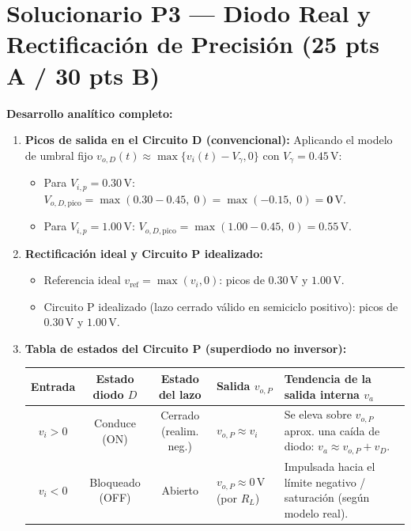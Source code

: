 \documentclass[10pt, a4paper]{article}
\begin{document}
\section*{Solucionario P3 --- Diodo Real y Rectificación de Precisión (25 pts A / 30 pts B)}

\textbf{Desarrollo analítico completo:}
\begin{enumerate}
    \renewcommand{\labelenumi}{(\alph{enumi})}
    \setlength{\itemsep}{3pt}
    \item \textbf{Picos de salida en el Circuito D (convencional):} Aplicando el modelo de umbral fijo $v_{o,D}(t) \approx \max\{v_i(t) - V_\gamma, 0\}$ con $V_\gamma = 0.45\,\mathrm{V}$:
    \begin{itemize}
        \item Para $V_{i,p} = 0.30\,\mathrm{V}$: $V_{o,D,\mathrm{pico}} = \max(0.30 - 0.45,\; 0) = \max(-0.15,\; 0) = \mathbf{0\,\mathrm{V}}$.
        \item Para $V_{i,p} = 1.00\,\mathrm{V}$: $V_{o,D,\mathrm{pico}} = \max(1.00 - 0.45,\; 0) = \mathbf{0.55\,\mathrm{V}}$.
    \end{itemize}
    \item \textbf{Rectificación ideal y Circuito P idealizado:}
    \begin{itemize}
        \item Referencia ideal $v_{\mathrm{ref}} = \max(v_i, 0)$: picos de $\mathbf{0.30\,\mathrm{V}}$ y $\mathbf{1.00\,\mathrm{V}}$.
        \item Circuito P idealizado (lazo cerrado válido en semiciclo positivo): picos de $\mathbf{0.30\,\mathrm{V}}$ y $\mathbf{1.00\,\mathrm{V}}$.
    \end{itemize}
    \item \textbf{Tabla de estados del Circuito P (superdiodo no inversor):}
    \begin{center}
        \footnotesize
        \renewcommand{\arraystretch}{1.35}
        \begin{tabularx}{\textwidth}{@{}c c c l X@{}}
            \toprule
            \textbf{Entrada} & \textbf{Estado diodo $D$} & \textbf{Estado del lazo} & \textbf{Salida $v_{o,P}$} & \textbf{Tendencia de la salida interna $v_a$} \\
            \midrule
            $v_i > 0$ & Conduce (ON) & Cerrado (realim. neg.) & $v_{o,P} \approx v_i$ & Se eleva sobre $v_{o,P}$ aprox. una caída de diodo: $v_a \approx v_{o,P} + v_D$. \\
            $v_i < 0$ & Bloqueado (OFF) & Abierto & $v_{o,P} \approx 0\,\mathrm{V}$ (por $R_L$) & Impulsada hacia el límite negativo / saturación (según modelo real). \\

\end{tabularx}
\end{center}
\end{enumerate}
\end{document}
